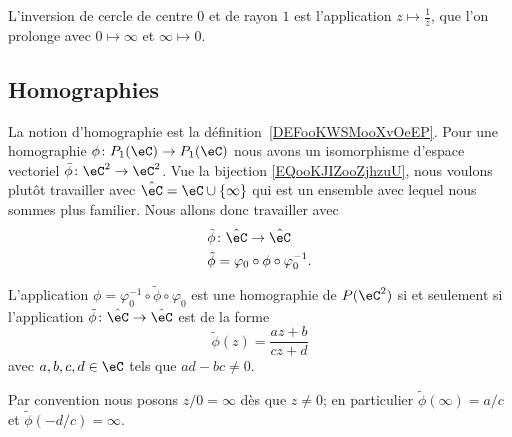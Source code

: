 \begin{example}
    L'inversion de cercle de centre \( 0\) et de rayon \( 1\) est l'application \( z\mapsto \frac{1}{ \bar z }\), que l'on prolonge avec \( 0\mapsto \infty\) et \( \infty\mapsto 0\).
\end{example}

\subsection{Homographies}

La notion d'homographie est la définition~\ref{DEFooKWSMooXvOeEP}. Pour une homographie \( \phi\colon P_1(\eC)\to P_1(\eC)\) nous avons un isomorphisme d'espace vectoriel \( \bar\phi\colon \eC^2\to \eC^2\). Vue la bijection \eqref{EQooKJIZooZjhzuU}, nous voulons plutôt travailler avec \( \hat \eC=\eC\cup\{ \infty \}\) qui est un ensemble avec lequel nous sommes plus familier. Nous allons donc travailler avec
\begin{equation}
    \begin{aligned}
        \tilde \phi&\colon \hat \eC\to \hat \eC \\
        \tilde \phi&=\varphi_0\circ\phi\circ\varphi_0^{-1}.
    \end{aligned}
\end{equation}

\begin{proposition}     \label{PROPooTZJBooPpowOo}
    L'application \( \phi=\varphi_0^{-1}\circ\tilde \phi\circ\varphi_0\) est une homographie de \( P(\eC^2)\) si et seulement si l'application \( \tilde \phi\colon \hat \eC\to \hat \eC\) est de la forme
    \begin{equation}
            \tilde \phi(z)=\frac{ az+b }{ cz+d }
    \end{equation}
    avec \( a,b,c,d\in \eC\) tels que \( ad-bc\neq 0\).

    Par convention nous posons \( z/0=\infty\) dès que \( z\neq 0\); en particulier $\tilde \phi(\infty)=a/c$ et \( \tilde \phi(-d/c)=\infty\).
\end{proposition}

